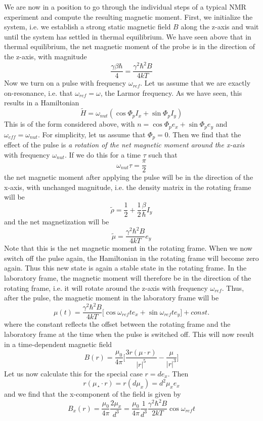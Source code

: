\documentclass[a4paper, draft]{article}
\theoremstyle{own}
\theoremstyle{remark}
\begin{document}
We are now in a position to go through the individual steps of a typical NMR experiment and compute the resulting magnetic moment. First, we initialize the system, i.e. we establish a strong static magnetic field $B$ along the z-axis and wait until the system has settled in thermal equilibrium. We have seen above that in thermal equilibrium, the net magnetic moment of the probe is in the direction of the z-axis, with magnitude
$$
\frac{\gamma \beta \hbar}{4} = \frac{\gamma^2 \hbar^2 B}{4kT} 
$$
Now we turn on a pulse with frequency $\omega_{ref}$. Let us assume that we are exactly on-resonance, i.e. that $\omega_{ref} = \omega$, the Larmor frequency. As we have seen, this results in a Hamiltonian
$$
\widetilde{H} =  \omega_{nut} ( \cos \Phi_p I_x + \sin \Phi_p I_y)
$$
This is of the form considered above, with $n = \cos \Phi_p e_x + \sin \Phi_p e_y$ and $\omega_{eff} = \omega_{nut}$. For simplicity, let us assume that $\Phi_p = 0$. Then we find that the effect of the pulse is {\it a rotation of the net magnetic moment around the x-axis} with frequency $\omega_{nut}$. If we do this for a time $\tau$ such that
$$
\omega_{nut} \tau = \frac{\pi}{2}
$$
the net magnetic moment after applying the pulse will be in the direction of the x-axis, with unchanged magnitude, i.e. the density matrix in the rotating frame will be
$$
\widetilde{\rho} = \frac{1}{2} + \frac{1}{2} \frac{\beta}{\hbar} I_y
$$
and the net magnetization will be 
$$
\tilde{\mu} = \frac{\gamma^2 \hbar^2 B}{4kT}  e_y
$$
Note that this is the net magnetic moment in the rotating frame. When we now switch off the pulse again, the Hamiltonian in the rotating frame will become zero again. Thus this new state is again a stable state in the rotating frame. In the laboratory frame, the magnetic moment will therefore be in the direction of the rotating frame, i.e. it will rotate around the z-axis with frequency $\omega_{ref}$. Thus, after the pulse, the magnetic moment in the laboratory frame will be
$$
\mu(t) = \frac{\gamma^2 \hbar^2 B}{4kT}  \big[ \cos \omega_{ref} t e_x + \sin \omega_{ref}t e_y \big] + const.
$$
where the constant reflects the offset between the rotating frame and the laboratory frame at the time when the pulse is switched off.
This will now result in a time-dependent magnetic field
$$
B(r) = \frac{\mu_0}{4\pi} \big[  \frac{3r(\mu \cdot r)}{|r|^5} - \frac{\mu}{|r|^3}\big] 
$$
Let us now calculate this for the special case $r = d e_x$. Then 
$$
r  (\mu ¸\cdot r) = r  (d \mu_x) = d^2 \mu_x e_x
$$
and we find that the x-component of the field is given by
$$
B_x(r) = \frac{\mu_0}{4\pi} \frac{2 \mu_x}{d^3} 
=
\frac{\mu_0}{4\pi} \frac{1}{d^3} 
\frac{\gamma^2 \hbar^2 B}{2kT}
\cos \omega_{ref} t
$$
\end{document}
